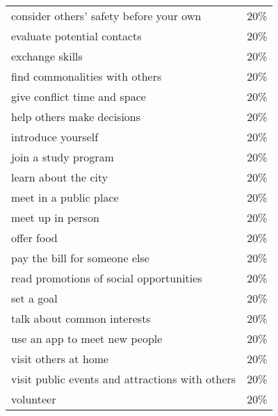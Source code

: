 \begin{longtable}{p{}r}
consider others' safety before your own                     & 20\%                        \\
evaluate potential contacts                                 & 20\%                        \\
exchange skills                                             & 20\%                        \\
find commonalities with others                              & 20\%                        \\
give conflict time and space                                & 20\%                        \\
help others make decisions                                  & 20\%                        \\
introduce yourself                                          & 20\%                        \\
join a study program                                        & 20\%                        \\
learn about the city                                        & 20\%                        \\
meet in a public place                                      & 20\%                        \\
meet up in person                                           & 20\%                        \\
offer food                                                  & 20\%                        \\
pay the bill for someone else                               & 20\%                        \\
read promotions of social opportunities                     & 20\%                        \\
set a goal                                                  & 20\%                        \\
talk about common interests                                 & 20\%                        \\
use an app to meet new people                               & 20\%                        \\
visit others at home                                        & 20\%                        \\
visit public events and attractions with others             & 20\%                        \\
volunteer                                                   & 20\%
\end{longtable}

